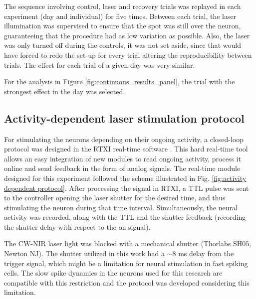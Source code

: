 The sequence involving control, laser and recovery trials was replayed in each experiment (day and individual) for five times. Between each trial, the laser illumination was supervised to ensure that the spot was still over the neuron, guaranteeing that the procedure had as low variation as possible. Also, the laser was only turned off during the controls, it was not set aside, since that would have forced to redo the set-up for every trial altering the reproducibility between trials. The effect for each trial of a given day was very similar. 


For the analysis in Figure \ref{fig:continuous_results_panel}, the trial with the strongest effect in the day was selected. 



\subsection{Activity-dependent laser stimulation protocol} 
\label{sect:methods-activity-dependent}

For stimulating the neurons depending on their ongoing activity, a closed-loop protocol was designed in the RTXI real-time software \parencite{patel_hard_2017}. This hard real-time tool allows an easy integration of new modules to read ongoing activity, process it online and send feedback in the form of analog signals. The real-time module designed for this experiment followed the scheme illustrated in Fig. \ref{fig:activity dependent protocol}. After processing the signal in RTXI, a TTL pulse was sent to the controller opening the laser shutter for the desired time, and thus stimulating the neuron during that time interval. Simultaneously, the neural activity was recorded, along with the TTL and the shutter feedback (recording the shutter delay with respect to the on signal).

The CW-NIR laser light was blocked with a mechanical shutter (Thorlabs SH05, Newton NJ). The shutter utilized in this work had a $\sim 8$ ms delay from the trigger signal, which might be a limitation for neural stimulation in fast spiking cells. The slow spike dynamics in the neurons used for this research are compatible with this restriction and the protocol was developed considering this limitation. 


